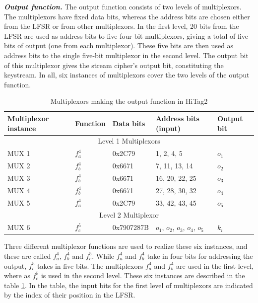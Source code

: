 \noindent \textit{\textbf{Output function.}} The output function consists of two levels of multiplexors. The multiplexors have fixed data bits, whereas the address bits are chosen either from the LFSR or from other multiplexors. In the first level, 20 bits from the LFSR are used as address bits to five four-bit multiplexors, giving a total of five bits of output (one from each multiplexor). These five bits are then used as address bits to the single five-bit multiplexor in the second level. The output bit of this multiplexor gives the stream cipher's output bit, constituting the keystream. In all, six instances of multiplexors cover the two levels of the output function.

\begin{table}[ht!]
\begin{center}
\small{
\begin{tabular}{|p{2.2cm}|l|p{2cm}|p{2.8cm}|p{1.5cm}|}
\hline 
\textbf{Multiplexor instance}	& \textbf{Function}		& \textbf{Data bits}	& \textbf{Address bits (input)}		& \textbf{Output bit}\\ \hline \hline
\multicolumn{5}{|c|}{Level 1 Multiplexors}\\ \hline \hline
MUX 1 			&	$f_a^4$			& 0x2C79			& 1, 2, 4, 5							& $o_1$\\
MUX 2 			&	$f_b^4$			& 0x6671			& 7, 11, 13, 14						& $o_2$\\
MUX 3 			&	$f_b^4$			& 0x6671			& 16, 20, 22, 25					& $o_3$\\
MUX 4 			&	$f_b^4$			& 0x6671			& 27, 28, 30, 32					& $o_4$\\
MUX 5 			&	$f_a^4$			& 0x2C79			& 33, 42, 43, 45					& $o_5$\\ \hline \hline
\multicolumn{5}{|c|}{Level 2 Multiplexor}\\ \hline \hline
MUX 6 			&	$f_c^5$			& 0x7907287B	& $o_1$, $o_2$, $o_3$, $o_4$, $o_5$		& $k_i$\\ \hline
\end{tabular}}
\end{center}
\caption{Multiplexors making the output function in HiTag2}
\label{tab:muxs}
\end{table}

Three different multiplexor functions are used to realize these six instances, and these are called $f_a^4$, $f_b^4$ and $f_c^5$. While $f_a^4$ and $f_b^4$ take in four bits for addressing the output, $f_c^5$ takes in five bits. The multiplexors $f_a^4$ and $f_b^4$ are used in the first level, where as $f_c^5$ is used in the second level. These six instances are described in the table \ref{tab:muxs}. In the table, the input bits for the first level of multiplexors are indicated by the index of their position in the LFSR.

